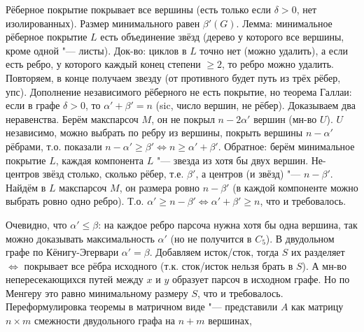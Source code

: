 	Рёберное покрытие покрывает все вершины (есть только если $\delta>0$, нет изолированных).
	Размер минимального равен $\beta'(G)$.
	Лемма: минимальное рёберное покрытие $L$ есть объединение звёзд (дерево у которого все вершины, кроме одной "--- листы).
	Док-во: циклов в $L$ точно нет (можно удалить), а если есть ребро, у которого каждый конец степени $\ge 2$, то ребро можно удалить.
	Повторяем, в конце получаем звезду (от противного будет путь из трёх рёбер, упс).
	Дополнение независимого рёберного не есть покрытие, но теорема Галлаи: если в графе $\delta>0$, то $\alpha'+\beta'=n$ (sic, число вершин, не рёбер).
	Доказываем два неравенства.
	Берём макспарсоч $M$, он не покрыл $n-2\alpha'$ вершин (мн-во $U$).
	$U$ независимо, можно выбрать по ребру из вершины, покрыть вершины $n-\alpha'$ рёбрами, т.о. показали $n-\alpha'\ge\beta' \iff n\ge\alpha'+\beta'$.
	Обратное: берём минимальное покрытие $L$, каждая компонента $L$ "--- звезда из хотя бы двух вершин.
	Не-центров звёзд столько, сколько рёбер, т.е. $\beta'$, а центров (и звёзд) "--- $n-\beta'$.
	Найдём в $L$ макспарсоч $M$, он размера ровно $n-\beta'$ (в каждой компоненте можно выбрать ровно одно ребро).
	Т.о. $\alpha' \ge n - \beta' \iff \alpha'+\beta' \ge n$, что и требовалось.

	Очевидно, что $\alpha' \le \beta$: на каждое ребро парсоча нужна хотя бы одна вершина, так можно доказывать максимальность $\alpha'$ (но не получится в $C_5$).
	В двудольном графе по Кёнигу-Эгервари $\alpha'=\beta$.
	Добавляем исток/сток, тогда $S$ их разделяет $\iff$ покрывает все рёбра исходного (т.к. сток/исток нельзя брать в $S$).
	А мн-во непересекающихся путей между $x$ и $y$ образует парсоч в исходном графе.
	Но по Менгеру это равно минимальному размеру $S$, что и требовалось.
	Переформулировка теоремы в матричном виде "--- представили $A$ как матрицу $n \times m$ смежности двудольного графа на $n+m$ вершинах,

